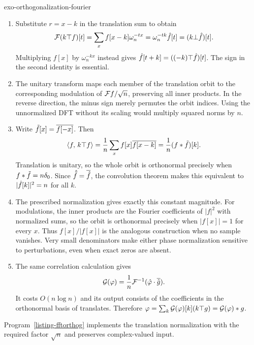 \begin{correction}{exo-orthogonalization-fourier}
\begin{enumerate}
\item Substitute $r=x-k$ in the translation sum to obtain
\[
 \mathcal{F}(k\top f)[t]=\sum_xf[x-k]\omega_n^{-tx}
 =\omega_n^{-tk}\hat{f}[t]=(k\bot\hat{f})[t].
\]
Multiplying $f[x]$ by $\omega_n^{-kx}$ instead gives
$\hat{f}[t+k]=((-k)\top\hat{f})[t]$. The sign in the second identity is essential.
\item The unitary transform maps each member of the translation orbit to
the corresponding modulation of $\mathcal{F} f/\sqrt n$, preserving all inner
products. In the reverse direction, the minus sign merely permutes the orbit
indices. Using the unnormalized DFT without its scaling would multiply
squared norms by $n$.
\item Write $\tilde{f}[x]=\overline{f[-x]}$. Then
\[
 \langle f,\,k\top f\rangle=\frac1n\sum_xf[x]\overline{f[x-k]}
                =\frac1n(f*\tilde{f})[k].
\]
Translation is unitary, so the whole orbit is orthonormal precisely when
$f*\tilde{f}=n\delta_0$. Since $\hat{\tilde{f}}=\overline{\hat{f}}$, the convolution
theorem makes this equivalent to $|\hat{f}[k]|^2=n$ for all $k$.
\item The prescribed normalization gives exactly this constant magnitude.
For modulations, the inner products are the Fourier coefficients of $|f|^2$
with normalized sums, so the orbit is orthonormal precisely when $|f[x]|=1$
for every $x$. Thus $f[x]/|f[x]|$ is the analogous construction when no
sample vanishes. Very small denominators make either phase normalization
sensitive to perturbations, even when exact zeros are absent.
\item The same correlation calculation gives
\[
 \mathcal{G}(\varphi)=\frac1n\mathcal{F}^{-1}(\hat{\varphi}\cdot\overline{\hat{g}}).
\]
It costs $O(n\log n)$ and its output consists of the coefficients in the
orthonormal basis of translates. Therefore
$\varphi=\sum_k\mathcal{G}(\varphi)[k](k\top g)=\mathcal{G}(\varphi)*g$.
\end{enumerate}
Program~\ref{listing-fftorthog} implements the translation normalization with
the required factor $\sqrt n$ and preserves complex-valued input.
\begin{listing}[H]
\caption{Orthonormalizing cyclic translates for the normalized inner product.}
\label{listing-fftorthog}
\end{listing}
\end{correction}
